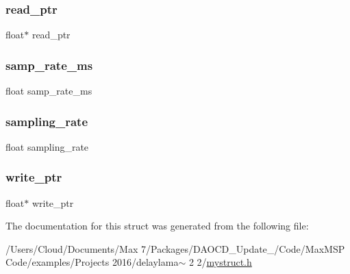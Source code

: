 \subsubsection{\texorpdfstring{read\+\_\+ptr}{read\_ptr}}
{\footnotesize\ttfamily float$\ast$ read\+\_\+ptr}

\mbox{\label{struct__delaylama_ad06216daf396171bc5906c9385caf5a9}} 
\subsubsection{\texorpdfstring{samp\+\_\+rate\+\_\+ms}{samp\_rate\_ms}}
{\footnotesize\ttfamily float samp\+\_\+rate\+\_\+ms}

\mbox{\label{struct__delaylama_a8d632437c1878f0244e942c89b3b99f9}} 
\subsubsection{\texorpdfstring{sampling\+\_\+rate}{sampling\_rate}}
{\footnotesize\ttfamily float sampling\+\_\+rate}

\mbox{\label{struct__delaylama_ac202512892d631747b5ef0c98de0367b}} 
\subsubsection{\texorpdfstring{write\+\_\+ptr}{write\_ptr}}
{\footnotesize\ttfamily float$\ast$ write\+\_\+ptr}



The documentation for this struct was generated from the following file\+:\begin{DoxyCompactItemize}
\item 
/\+Users/\+Cloud/\+Documents/\+Max 7/\+Packages/\+D\+A\+O\+C\+D\+\_\+\+Update\+\_/\+Code/\+Max\+M\+S\+P Code/examples/\+Projects 2016/delaylama$\sim$ 2 2/\mbox{\hyperlink{mystruct_8h}{mystruct.\+h}}\end{DoxyCompactItemize}
